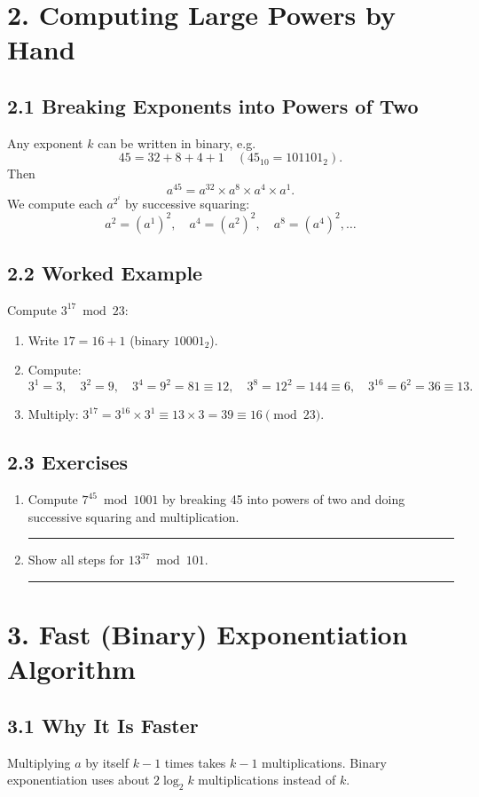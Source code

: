 \documentclass[12pt]{article}
\begin{document}
\section{2. Computing Large Powers by Hand}
\subsection{2.1 Breaking Exponents into Powers of Two}
Any exponent $k$ can be written in binary, e.g.
\[
  45 = 32 + 8 + 4 + 1 \quad(45_{10}=101101_2).
\]
Then
\[
  a^{45} = a^{32}\times a^{8}\times a^{4}\times a^{1}.
\]
We compute each $a^{2^i}$ by successive squaring:
\[
  a^2=(a^1)^2,\quad a^4=(a^2)^2,\quad a^8=(a^4)^2,\dots
\]

\subsection{2.2 Worked Example}
Compute $3^{17}\bmod23$:
\begin{enumerate}[label=\arabic*.]
  \item Write $17=16+1$ (binary $10001_2$).
  \item Compute:
    \[
      3^1=3,\quad
      3^2=9,\quad
      3^4=9^2=81\equiv12,\quad
      3^8=12^2=144\equiv6,\quad
      3^{16}=6^2=36\equiv13.
    \]
  \item Multiply: $3^{17}=3^{16}\times3^1\equiv13\times3=39\equiv16\pmod{23}$.  
\end{enumerate}

\subsection{2.3 Exercises}
\begin{enumerate}[label=Exercise 2.\arabic*]
  \item Compute $7^{45}\bmod{1001}$ by breaking 45 into powers of two and doing successive squaring and multiplication.\rule{6cm}{0.4pt}
  \item Show all steps for $13^{37}\bmod{101}$.\rule{6cm}{0.4pt}
\end{enumerate}

\section{3. Fast (Binary) Exponentiation Algorithm}
\subsection{3.1 Why It Is Faster}
Multiplying $a$ by itself $k-1$ times takes $k-1$ multiplications.  Binary exponentiation uses about $2\log_2 k$ multiplications instead of $k$.
\end{document}
